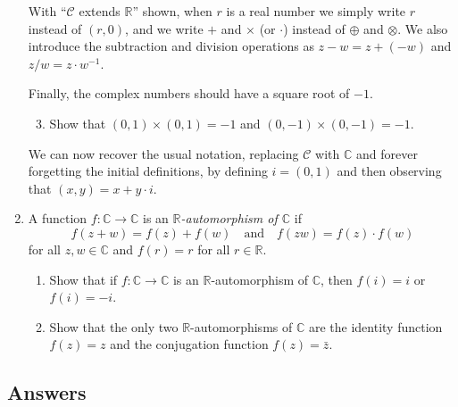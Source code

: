 \begin{enumerate}
\begin{enumerate}
\end{enumerate}
With ``$\mathcal{C}$ extends $\mathbb{R}$'' shown, when $r$ is a real number we simply write $r$ instead of $(r,0)$, and we write $+$ and $\times$ (or $\cdot$) instead of $\oplus$ and $\otimes$. We also introduce the subtraction and division operations as $z - w = z + (-w)$ and $z/w = z\cdot w^{-1}$.\par
Finally, the complex numbers should have a square root of $-1$.
\begin{enumerate}\setcounter{enumii}{2}
\item Show that $(0,1)\times (0,1) = -1$ and $(0,-1)\times (0,-1) = -1$.
\end{enumerate}
We can now recover the usual notation, replacing $\mathcal{C}$ with $\mathbb{C}$ and forever forgetting the initial definitions, by defining $i = (0,1)$ and then observing that $(x,y) = x + y\cdot i$.
\item A function $f:\mathbb{C}\to\mathbb{C}$ is an \emph{$\mathbb{R}$-automorphism of $\mathbb{C}$} if
\begin{equation*}
f(z + w) = f(z) + f(w)\quad\text{and}\quad f(zw) = f(z)\cdot f(w)
\end{equation*}
for all $z,w\in\mathbb{C}$ and $f(r) = r$ for all $r\in\mathbb{R}$.
\begin{enumerate}
\item Show that if $f:\mathbb{C}\to\mathbb{C}$ is an $\mathbb{R}$-automorphism of $\mathbb{C}$, then $f(i) = i$ or $f(i) = -i$.
\item Show that the only two $\mathbb{R}$-automorphisms of $\mathbb{C}$ are the identity function $f(z) = z$ and the conjugation function $f(z) = \bar{z}$.
\end{enumerate}
\end{enumerate}


\newpage
\subsection{Answers}


